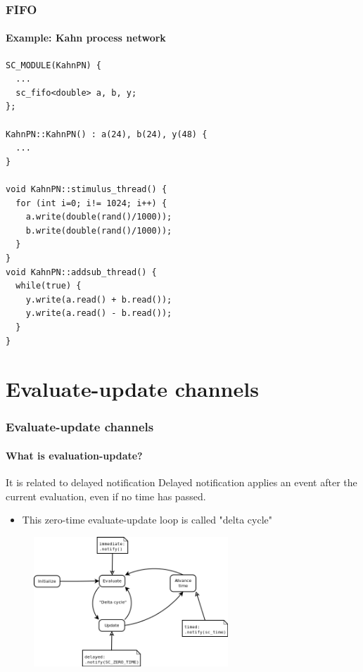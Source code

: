 \begin{frame}[fragile]
\frametitle{FIFO}
\framesubtitle{Example: Kahn process network}

{\scriptsize 
\begin{verbatim}
SC_MODULE(KahnPN) {
  ...
  sc_fifo<double> a, b, y;
};

KahnPN::KahnPN() : a(24), b(24), y(48) {
  ...
}

void KahnPN::stimulus_thread() {
  for (int i=0; i!= 1024; i++) {
    a.write(double(rand()/1000));
    b.write(double(rand()/1000));
  }
}
void KahnPN::addsub_thread() {
  while(true) {
    y.write(a.read() + b.read());
    y.write(a.read() - b.read());
  }
}
\end{verbatim}
}
\end{frame}

\section{Evaluate-update channels}

\begin{frame}
\frametitle{Evaluate-update channels}
\framesubtitle{What is evaluation-update?}

\begin{block}{It is related to delayed notification}
Delayed notification applies an event after the current evaluation, even if no time has passed.
\begin{itemize}
\item This zero-time evaluate-update loop is called "delta cycle"
\end{itemize}
\end{block}

\begin{figure}
\includegraphics[width=0.65\textwidth]{lecture11/img/simulator.png}
\end{figure}

\end{frame}

